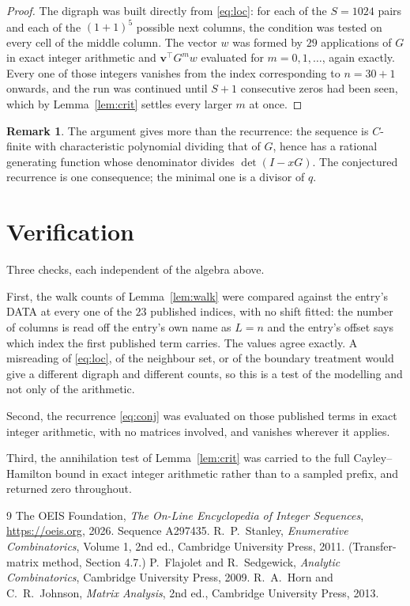 \documentclass[11pt,a4paper]{article}
\theoremstyle{plain}
\theoremstyle{definition}
\newtheorem{remark}[theorem]{Remark}
\begin{document}
\begin{proof}
The digraph was built directly from \eqref{eq:loc}: for each of the $S=1024$ pairs and each
of the $(1+1)^{5}$ possible next columns, the condition was tested on every cell of
the middle column. The vector $w$ was formed by $29$ applications of $G$ in exact integer
arithmetic and $\mathbf{v}^{\!\top}G^{m}w$ evaluated for $m=0,1,\dots$, again exactly.
Every one of those integers vanishes from the index corresponding to $n=30+1$ onwards,
and the run was continued until $S+1$ consecutive zeros had been seen, which by
Lemma~\ref{lem:crit} settles every larger $m$ at once.
\end{proof}

\begin{remark}
The argument gives more than the recurrence: the sequence is $C$-finite with characteristic
polynomial dividing that of $G$, hence has a rational generating function whose denominator
divides $\det(I-xG)$. The conjectured recurrence is one consequence; the minimal one is a
divisor of $q$.
\end{remark}

\section{Verification}

Three checks, each independent of the algebra above.

First, the walk counts of Lemma~\ref{lem:walk} were compared against the entry's DATA at
every one of the $23$ published indices, with no shift fitted: the number of columns is
read off the entry's own name as $L=n$ and the entry's offset says which index the first
published term carries. The values agree exactly. A misreading of \eqref{eq:loc}, of the
neighbour set, or of the boundary treatment would give a different digraph and different
counts, so this is a test of the modelling and not only of the arithmetic.

Second, the recurrence \eqref{eq:conj} was evaluated on those published terms in exact
integer arithmetic, with no matrices involved, and vanishes wherever it applies.

Third, the annihilation test of Lemma~\ref{lem:crit} was carried to the full
Cayley--Hamilton bound in exact integer arithmetic rather than to a sampled prefix, and
returned zero throughout.

\begin{thebibliography}{9}
 The OEIS Foundation, \emph{The On-Line Encyclopedia of Integer
Sequences}, \url{https://oeis.org}, 2026. Sequence A297435.
 R.~P.~Stanley, \emph{Enumerative Combinatorics}, Volume 1, 2nd ed.,
Cambridge University Press, 2011. (Transfer-matrix method, Section 4.7.)
 P.~Flajolet and R.~Sedgewick, \emph{Analytic Combinatorics}, Cambridge
University Press, 2009.
 R.~A.~Horn and C.~R.~Johnson, \emph{Matrix Analysis}, 2nd ed., Cambridge
University Press, 2013.
\end{thebibliography}
\end{document}
